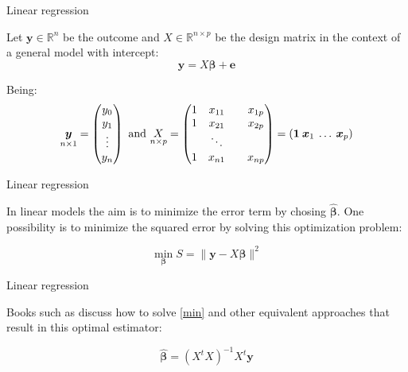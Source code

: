 \documentclass[ignorenonframetext,compress,aspectratio=169]{beamer}
\renewcommand{\vec}[1]{\boldsymbol{#1}}
\newcommand{\R}{\mathbb{R}}
\begin{document}
\begin{frame}{Linear regression}

Let \(\vec{y} \in \R^n\) be the outcome and \(X \in \R^{n\times p}\) be
the design matrix in the context of a general model with intercept:
\[\vec{y} = X\vec{\beta} + \vec{e}\]

Being: \[
\underset{n\times 1}{\vec{y}} = \begin{pmatrix}y_0 \cr y_1 \cr \vdots \cr y_n\end{pmatrix}
\text{ and }
\underset{n\times p}{X} = \begin{pmatrix}1 & x_{11} & & x_{1p} \cr 1 & x_{21} & & x_{2p} \cr & \ddots & \cr 1 & x_{n1} & & x_{np}\end{pmatrix} = (\vec{1} \: \vec{x}_1 \: \ldots \: \vec{x}_p)
\]

\end{frame}

\begin{frame}{Linear regression}

In linear models the aim is to minimize the error term by chosing
\(\hat{\vec{\beta}}\). One possibility is to minimize the squared error
by solving this optimization problem:

\begin{equation}
\label{min}
\displaystyle \min_{\vec{\beta}} S = \|\vec{y} - X\vec{\beta}\|^2
\end{equation}

\end{frame}

\begin{frame}{Linear regression}

Books such as \citet{Baltagi2011} discuss how to solve \eqref{min} and
other equivalent approaches that result in this optimal estimator:

\begin{equation}
\label{beta}
\hat{\vec{\beta}} = (X^tX)^{-1} X^t\vec{y}
\end{equation}

\end{frame}

\end{document}
